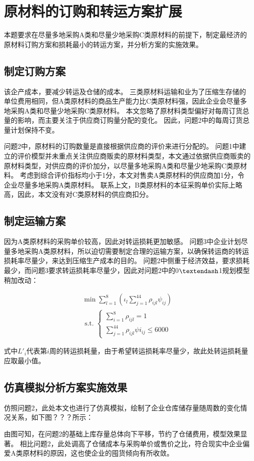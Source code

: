 
\section{原材料的订购和转运方案扩展}

本题要求在尽量多地采购A类和尽量少地采购C类原材料的前提下，制定最经济的原材料订购方案和损耗最小的转运方案，并分析方案的实施效果。

\subsection{制定订购方案}

该企产成本，要减少转运及仓储的成本。
三类原材料运输和业为了压缩生存储的单位费用相同，但A类原材料的商品生产能力比C类原材料强，因此企业会尽量多地采购A类和尽量少地采购C类原材料。
本文忽略了原材料类型偏好对每周订货总量的影响，而主要关注于供应商订购量分配的变化。
因此，问题2中的每周订货总量计划保持不变。

问题2中，原材料的订购数量是直接根据供应商的评价来进行分配的。
问题1中建立的评价模型并未重点关注供应商贩卖的原材料类型，本文通过依据供应商贩卖的原材料类型，对供应商的评价加分，以尽量多地采购A类和尽量少地采购C类原材料。
考虑到综合评价指标均小于1分，本文对售卖A类原材料的供应商加1分，令企业尽量多地采购A类原材料。
联系上文，B类原材料的本征采购单价实际上略高，因此，本文没有对C类原材料的供应商扣分。

\subsection{制定运输方案}

因为A类原材料的采购单价较高，因此对转运损耗更加敏感。
问题3中企业计划尽量多地采购A类原材料，所以迫切需要制定合理的运输方案，以确保转运商的转运损耗率尽量少，来达到压缩生产成本的目的。
问题2中侧重于经济效益，要求损耗最少，而问题3要求转运损耗率尽量少，因此对问题2中的0$\textendash$1规划模型稍加改动：

\begin{equation}
\begin{array}{l}
\min \sum_{l=1}^{8}\left(\iota_{l} \sum_{j=1}^{44} \rho_{i j l} \psi_{i j}\right) \\
\text { s.t. }\left\{\begin{array}{l}
\sum_{i=1}^{8} \rho_{i j l}=1 \\
\sum_{j=1}^{44} \rho_{i j l} \psi i_{i j} \leq 6000
\end{array}\right.
\end{array}
\end{equation}

式中$L'_i$代表第$i$周的转运损耗量，由于希望转运损耗率尽量少，故此处转运损耗量应取最小值。

\subsection{仿真模拟分析方案实施效果}

仿照问题2，此处本文也进行了仿真模拟，绘制了企业仓库储存量随周数的变化情况关系，如下图？？？所示：

%

由图可知，在问题2的基础上库存量总体向下平移，节约了仓储费用，模型效果显著。
相比问题2，此处调高了仓储成本与采购单价或售价之比，符合现实中企业偏爱A类原材料的原因，这也使企业的囤货倾向有所收敛。
